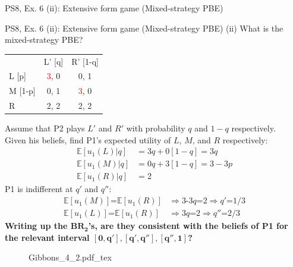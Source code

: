 \begin{frame}{PS8, Ex. 6 (ii): Extensive form game (Mixed-strategy PBE)}
\begin{multicols}{2}
      \vfill\null
    \end{multicols}
\end{frame}
\begin{frame}{PS8, Ex. 6 (ii): Extensive form game (Mixed-strategy PBE)}
    (ii) What is the mixed-strategy PBE? \vspace{-8pt}
    \begin{multicols}{2}
      \begin{table}
        \begin{tabular}{l|c|c|}
          \multicolumn{1}{c}{} & \multicolumn{1}{c}{L' [q]} & \multicolumn{1}{c}{R' [1-q]} \\\cline{2-3}
          L [p]   & \textcolor{red}{3}, 0 & 0, \color{blue}1 \\\cline{2-3}
          M [1-p] & 0, \color{blue}1 & \textcolor{red}{3}, 0 \\\cline{2-3}
          R       & 2, \color{blue}2 & 2, \color{blue}2 \\\cline{2-3}
        \end{tabular}
      \end{table} \vspace{-4pt}
      Assume that P2 plays $L'$ and $R'$ with probability $q$ and $1-q$ respectively.\\\smallskip
      Given his beliefs, find P1's expected utility of $L$, $M$, and $R$ respectively: \vspace{-4pt}
      \begin{align*}
        \mathbb{E}[u_1(L)|q]&=3q+0[1-q]=3q\\
        \mathbb{E}[u_1(M)|q]&=0q+3[1-q]=3-3p\\
        \mathbb{E}[u_1(R)|q]&=2
      \end{align*}
      P1 is indifferent at $q'$ and $q''$: \vspace{-6pt}
      \begin{align*}
        \mathbb{E}[u_1(M)]\text{=}\mathbb{E}[u_1(R)]&\Rightarrow \text{3-3}q\text{=}2\Rightarrow q'\text{=}1/3\\
        \mathbb{E}[u_1(L)]\text{=}\mathbb{E}[u_1(R)]&\Rightarrow 3q\text{=}2\Rightarrow q''\text{=}2/3
      \end{align*}
      \textbf{Writing up the $\bm{BR_2}$'s, are they consistent with the beliefs of P1 for the relevant interval $\bm{[0,q'],[q',q''],[q'',1]}$?}
      \vfill\null\columnbreak
      \begin{figure}[!h]
        \center {}
        {Gibbons_4_2.pdf_tex}

\end{figure}
\end{multicols}
\end{frame}
